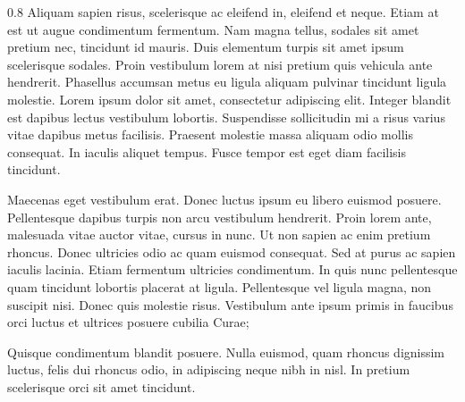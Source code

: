 \documentclass[a0]{a0poster}
\begin{document}
\framethin
\begin{area4}{0.8}
Aliquam sapien risus, scelerisque ac eleifend in, eleifend et neque. Etiam at est ut augue condimentum fermentum. Nam magna tellus, sodales sit amet pretium nec, tincidunt id mauris. Duis elementum turpis sit amet ipsum scelerisque sodales. Proin vestibulum lorem at nisi pretium quis vehicula ante hendrerit. Phasellus accumsan metus eu ligula aliquam pulvinar tincidunt ligula molestie. Lorem ipsum dolor sit amet, consectetur adipiscing elit. Integer blandit est dapibus lectus vestibulum lobortis. Suspendisse sollicitudin mi a risus varius vitae dapibus metus facilisis. Praesent molestie massa aliquam odio mollis consequat. In iaculis aliquet tempus. Fusce tempor est eget diam facilisis tincidunt.

Maecenas eget vestibulum erat. Donec luctus ipsum eu libero euismod posuere. Pellentesque dapibus turpis non arcu vestibulum hendrerit. Proin lorem ante, malesuada vitae auctor vitae, cursus in nunc. Ut non sapien ac enim pretium rhoncus. Donec ultricies odio ac quam euismod consequat. Sed at purus ac sapien iaculis lacinia. Etiam fermentum ultricies condimentum. In quis nunc pellentesque quam tincidunt lobortis placerat at ligula. Pellentesque vel ligula magna, non suscipit nisi. Donec quis molestie risus. Vestibulum ante ipsum primis in faucibus orci luctus et ultrices posuere cubilia Curae;

Quisque condimentum blandit posuere. Nulla euismod, quam rhoncus dignissim luctus, felis dui rhoncus odio, in adipiscing neque nibh in nisl. In pretium scelerisque orci sit amet tincidunt. 

\end{area4}
\end{document}
